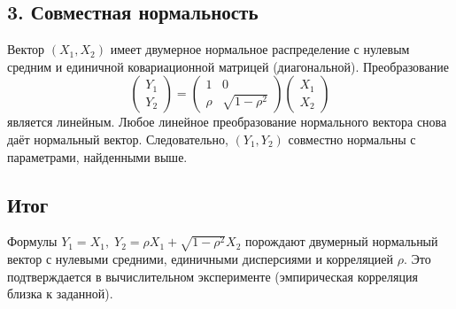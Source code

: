 \documentclass{article}
\begin{document}
\subsection*{3. Совместная нормальность}
Вектор \((X_1, X_2)\) имеет двумерное нормальное распределение с нулевым средним и единичной ковариационной матрицей (диагональной). Преобразование
\[
\begin{pmatrix} Y_1 \\ Y_2 \end{pmatrix}
= \begin{pmatrix} 1 & 0 \\ \rho & \sqrt{1-\rho^2} \end{pmatrix}
\begin{pmatrix} X_1 \\ X_2 \end{pmatrix}
\]
является линейным. Любое линейное преобразование нормального вектора снова даёт нормальный вектор. Следовательно, \((Y_1, Y_2)\) совместно нормальны с параметрами, найденными выше.

\subsection*{Итог}
Формулы \(Y_1 = X_1,\; Y_2 = \rho X_1 + \sqrt{1-\rho^2}X_2\) порождают двумерный нормальный вектор с нулевыми средними, единичными дисперсиями и корреляцией \(\rho\). Это подтверждается в вычислительном эксперименте (эмпирическая корреляция близка к заданной).
\end{document}

